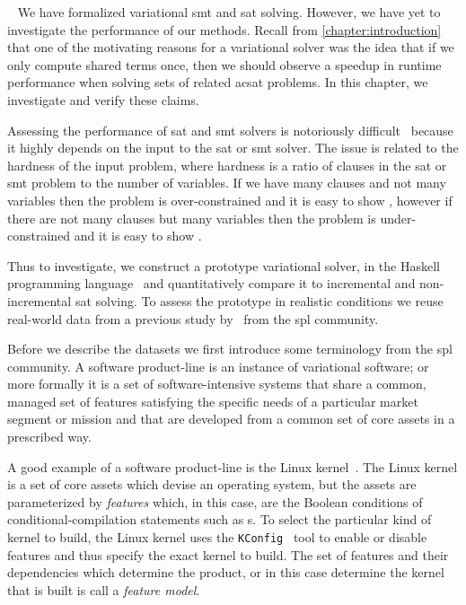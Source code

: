 ~\label{chapter:case-studies}
%
We have formalized variational \ac{smt} and \ac{sat} solving. However, we have
yet to investigate the performance of our methods. Recall from
\autoref{chapter:introduction} that one of the motivating reasons for a
variational solver was the idea that if we only compute shared terms once, then
we should observe a speedup in runtime performance when solving sets of related
ac{sat} problems. In this chapter, we investigate and verify these claims.

Assessing the performance of \ac{sat} and \ac{smt} solvers is notoriously
difficult~\cite{Gent94thesat} because it highly depends on the input to the
\ac{sat} or \ac{smt} solver. The issue is related to the hardness of the input
problem, where hardness is a ratio of clauses in the \ac{sat} or \ac{smt}
problem to the number of variables. If we have many clauses and not many
variables then the problem is over-constrained and it is easy to show
, however if there are not many clauses but many variables then the
problem is under-constrained and it is easy to show .

Thus to investigate, we construct a prototype variational solver, \vsat{} in the
Haskell programming language~\cite{Hudak:1992:RPL:130697.130699} and
quantitatively compare it to incremental and non-incremental \ac{sat} solving.
To assess the prototype in realistic conditions we reuse real-world data from a
previous study by~\citet{NMS+:GPCE18} from the \ac{spl} community.

Before we describe the datasets we first introduce some terminology from the
\ac{spl} community. A software product-line is an instance of variational
software; or more formally it is a set of
software-intensive systems that share a common, managed set of features
satisfying the specific needs of a particular market segment or mission and that
are developed from a common set of core assets in a prescribed way.

A good example of a software product-line is the Linux kernel~\cite{linux}. The
Linux kernel is a set of core assets which devise an operating system, but the
assets are parameterized by \emph{features} which, in this case, are the Boolean
conditions of conditional-compilation statements such as s. To select
the particular kind of kernel to build, the Linux kernel uses the
\texttt{KConfig}~\cite{kconfig} tool to enable or disable features and thus
specify the exact kernel to build. The set of features and their dependencies
which determine the product, or in this case determine the kernel that is built
is call a \emph{feature model}\cite{KCHNP90}.

